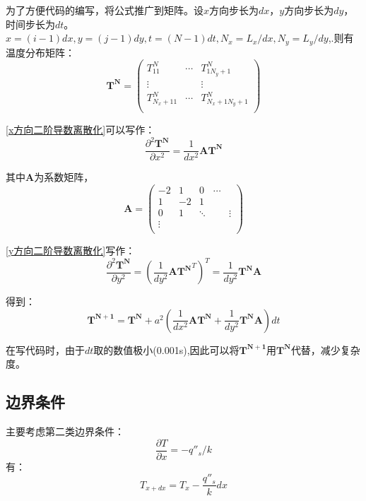 为了方便代码的编写，将公式推广到矩阵。设$x$方向步长为$dx$，$y$方向步长为$dy$，时间步长为$dt$。$x=(i-1)dx,y=(j-1)dy,t=(N-1)dt,N_x=L_x/dx,N_y=L_y/dy$,.则有温度分布矩阵：
\begin{equation}
\boldsymbol{T^N} =
    \begin{pmatrix}
        T_{11}^N        & \cdots & T_{1  N_y+1}^N   \\
        \vdots          &        & \vdots           \\
        T_{N_x+1 1}^N   & \cdots & T_{N_x+1 N_y+1}^N\\
    \end{pmatrix}
\end{equation}

\eqref{x方向二阶导数离散化}可以写作：
\begin{equation}
    \frac{\partial^2 \boldsymbol{T^N}}{\partial x^2} =\frac{1}{dx^2}\boldsymbol{A}\boldsymbol{T^N}
\end{equation}

其中$\boldsymbol{A}$为系数矩阵，
\begin{equation}
\boldsymbol{A} =
    \begin{pmatrix}
        -2 &   1 & 0  & \cdots  \\
        1  &  -2 & 1  &  \\
        0  &   1 & \ddots &        & \vdots \\
        \vdots \\
    \end{pmatrix}
\end{equation}

\eqref{y方向二阶导数离散化}写作：
\begin{equation}
    \frac{\partial^2 \boldsymbol{T^N}}{\partial y^2} = (\frac{1}{dy^2}\boldsymbol{A}\boldsymbol{T^N}^T)^T = \frac{1}{dy^2}\boldsymbol{T^N}\boldsymbol{A}
\end{equation}

得到：
\begin{equation}\label{final equation}
    \boldsymbol{T^{N+1} = \boldsymbol{T^N}} + a^2(\frac{1}{dx^2}\boldsymbol{A}\boldsymbol{T^N}+\frac{1}{dy^2}\boldsymbol{T^N}\boldsymbol{A}) dt  
\end{equation}

在写代码时，由于$dt$取的数值极小(0.001s),因此可以将$\boldsymbol{T^{N+1}}$用$\boldsymbol{T^N}$代替，减少复杂度。

\subsection{边界条件}

主要考虑第二类边界条件：
\begin{equation}
    \frac{\partial T}{\partial x} = -q''_s/k
\end{equation}
有：
\begin{equation}
    T_{x+dx} = T_x -\frac{q''_s}{k}dx
\end{equation}
